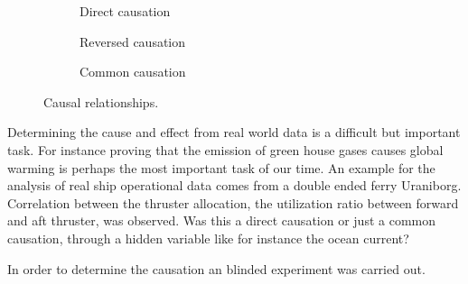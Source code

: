 \documentclass[fleqn,10pt]{olplainarticle}
\begin{document}
\begin{figure}[!htb]
    \begin{subfigure}[b]{0.3\textwidth}
        \centering
        \caption{Direct causation}
        \label{fig:direct_causation}
    \end{subfigure}
    \hfill
    \begin{subfigure}[b]{0.3\textwidth}
        \centering
        \caption{Reversed causation}
        \label{fig:reversed_causation}
    \end{subfigure}
    \hfill
    \begin{subfigure}[b]{0.3\textwidth}
        \centering
        \caption{Common causation}
        \label{fig:common_causation}
    \end{subfigure}
    \caption{Causal relationships.}
    \label{fig:causal_relationships}
    
\end{figure}
Determining the cause and effect from real world data is a difficult but important task. For instance proving that the emission of green house gases causes global warming is perhaps the most important task of our time. 
An example for the analysis of real ship operational data comes from a double ended ferry Uraniborg. Correlation between the thruster allocation, the utilization ratio between forward and aft thruster, was observed. Was this a direct causation or just a common causation, through a hidden variable like for instance the ocean current? 

In order to determine the causation an blinded experiment was carried out.
\end{document}

